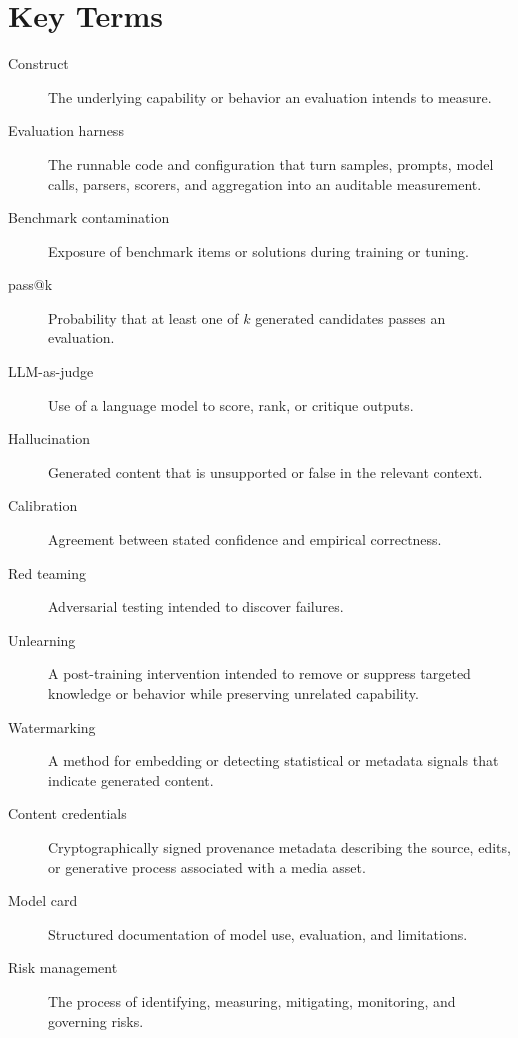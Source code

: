 \section{Key Terms}
\begin{description}
    \item[Construct] The underlying capability or behavior an evaluation intends to measure.
    \item[Evaluation harness] The runnable code and configuration that turn samples, prompts, model calls, parsers, scorers, and aggregation into an auditable measurement.
    \item[Benchmark contamination] Exposure of benchmark items or solutions during training or tuning.
    \item[pass@k] Probability that at least one of $k$ generated candidates passes an evaluation.
    \item[LLM-as-judge] Use of a language model to score, rank, or critique outputs.
    \item[Hallucination] Generated content that is unsupported or false in the relevant context.
    \item[Calibration] Agreement between stated confidence and empirical correctness.
    \item[Red teaming] Adversarial testing intended to discover failures.
    \item[Unlearning] A post-training intervention intended to remove or suppress targeted knowledge or behavior while preserving unrelated capability.
    \item[Watermarking] A method for embedding or detecting statistical or metadata signals that indicate generated content.
    \item[Content credentials] Cryptographically signed provenance metadata describing the source, edits, or generative process associated with a media asset.
    \item[Model card] Structured documentation of model use, evaluation, and limitations.
    \item[Risk management] The process of identifying, measuring, mitigating, monitoring, and governing risks.
\end{description}

